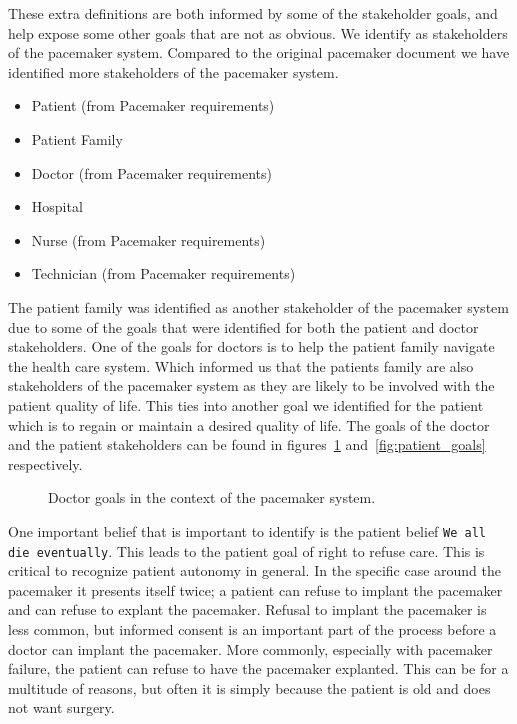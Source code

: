 These extra definitions are both informed by some of the stakeholder goals, and help expose some other goals that are not as obvious. We identify as stakeholders of the pacemaker system. Compared to the original pacemaker document we have identified more stakeholders of the pacemaker system. 

\begin{itemize}
	\item Patient (from Pacemaker requirements)
	\item Patient Family
	\item Doctor (from Pacemaker requirements)
	\item Hospital
	\item Nurse (from Pacemaker requirements)
	\item Technician (from Pacemaker requirements)
\end{itemize}

The patient family was identified as another stakeholder of the pacemaker system due to some of the goals that were identified for both the patient and doctor stakeholders. One of the goals for doctors is to help the patient family navigate the health care system. Which informed us that the patients family are also stakeholders of the pacemaker system as they are likely to be involved with the patient quality of life. This ties into another goal we identified for the patient which is to regain or maintain a desired quality of life. The goals of the doctor and the patient stakeholders can be found in figures~\ref{fig:doctor_goals} and~\ref{fig:patient_goals} respectively.

\begin{figure}
	\centering
	
	\caption{Doctor goals in the context of the pacemaker system.}
	\label{fig:doctor_goals}
\end{figure}

One important belief that is important to identify is the patient belief \texttt{We all die eventually}. This leads to the patient goal of right to refuse care. This is critical to recognize patient autonomy in general. In the specific case around the pacemaker it presents itself twice; a patient can refuse to implant the pacemaker and can refuse to explant the pacemaker. Refusal to implant the pacemaker is less common, but informed consent is an important part of the process before a doctor can implant the pacemaker. More commonly, especially with pacemaker failure, the patient can refuse to have the pacemaker explanted. This can be for a multitude of reasons, but often it is simply because the patient is old and does not want surgery.

